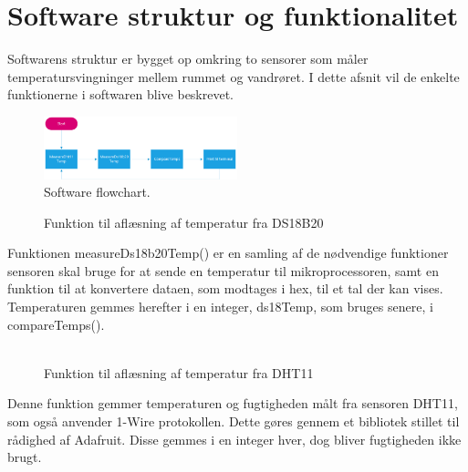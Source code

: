 \section{Software struktur og funktionalitet}
Softwarens struktur er bygget op omkring to sensorer som måler temperatursvingninger mellem rummet og vandrøret. I dette afsnit vil de enkelte funktionerne i softwaren blive beskrevet. 
\begin{figure}[h!]
  \centering
  \includegraphics[width=0.5\textwidth]{figures/Fase1software2.png}
  \caption{Software flowchart.}
  \label{fase1flow}
\end{figure}

\begin{figure}[h!]
  \centering
  \caption{Funktion til aflæsning af temperatur fra DS18B20}
  \label{ds18b20Measure}
\end{figure}
Funktionen measureDs18b20Temp() er en samling af de nødvendige funktioner sensoren skal bruge for at sende en temperatur til mikroprocessoren, samt en funktion til at konvertere dataen, som modtages i hex, til et tal der kan vises.\newline
Temperaturen gemmes herefter i en integer, ds18Temp, som bruges senere, i compareTemps().\\\\

\begin{figure}[h!]
  \centering
  \caption{Funktion til aflæsning af temperatur fra DHT11}
  \label{dht11Measure}
\end{figure}
Denne funktion gemmer temperaturen og fugtigheden målt fra sensoren DHT11, som også anvender 1-Wire protokollen. Dette gøres gennem et bibliotek stillet til rådighed af Adafruit.\newline
Disse gemmes i en integer hver, dog bliver fugtigheden ikke brugt.

